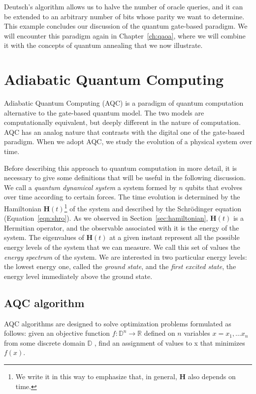 Deutsch's algorithm allows us to halve the number of oracle queries, and it can be extended to an arbitrary number of bits whose parity we want to determine. This example concludes our discussion of the quantum gate-based paradigm. We will encounter this paradigm again in Chapter~\ref{ch:qaoa}, where we will combine it with the concepts of quantum annealing that we now illustrate.

\section{Adiabatic Quantum Computing}
\label{sec:qac_model}
Adiabatic Quantum Computing (AQC) is a paradigm of quantum computation alternative to the gate-based quantum model. The two models are computationally equivalent, but deeply different in the nature of computation. AQC has an analog nature that contrasts with the digital one of the gate-based paradigm. When we adopt AQC, we study the evolution of a physical system over time. 

Before describing this approach to quantum computation in more detail, it is necessary to give some definitions that will be useful in the following discussion. We call a \emph{quantum dynamical system} a system formed by $n$ qubits that evolves over time according to certain forces. The time evolution is determined by the Hamiltonian $\mathbf{H}(t)$\footnote{We write it in this way to emphasize that, in general, $\mathbf{H}$ also depends on time.} of the system and described by the Schrödinger equation (Equation~\ref{eqn:shro}). As we observed in Section~\ref{sec:hamiltonian}, $\mathbf{H}(t)$ is a Hermitian operator, and the observable associated with it is the energy of the system. The eigenvalues of $\mathbf{H}(t)$ at a given instant represent all the possible energy levels of the system that we can measure. We call this set of values the \emph{energy spectrum} of the system. We are interested in two particular energy levels: the lowest energy one, called the \emph{ground state}, and the \emph{ﬁrst excited state}, the energy level immediately above the ground state.

\subsection{AQC algorithm}
\label{sec:qac}
AQC algorithms are designed to solve optimization problems formulated as follows: given an objective function $f: \mathbb{D}^n\rightarrow\mathbb{R}$ deﬁned on $n$ variables $x = x_1, \dots x_n$ from some discrete domain
$\mathbb{D}$ , ﬁnd an assignment of values to x that minimizes $f(x)$.

